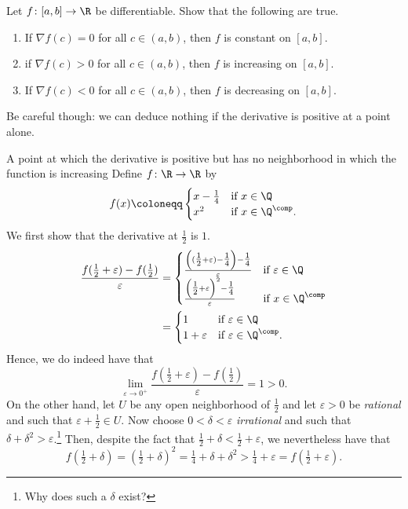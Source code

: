 \begin{exr}{}{}
Let $f\colon [a,b]\rightarrow \R$ be differentiable.  Show that the following are true.
\begin{enumerate}
\item If $\nabla f(c)=0$ for all $c\in (a,b)$, then $f$ is constant on $[a,b]$.
\item if $\nabla f(c)>0$ for all $c\in (a,b)$, then $f$ is increasing on $[a,b]$.
\item If $\nabla f(c)<0$ for all $c\in (a,b)$, then $f$ is decreasing on $[a,b]$.
\end{enumerate}
\end{exr}
Be careful though:  we can deduce nothing if the derivative is positive at a point alone.
\begin{exm}{A point at which the derivative is positive but has no neighborhood in which the function is increasing}{}
Define $f\colon \R \rightarrow \R$ by
\begin{equation}
f(x)\coloneqq \begin{cases}x-\tfrac{1}{4} & \text{if }x\in \Q \\ x^2 & \text{if }x\in \Q ^{\comp}.\end{cases}
\end{equation}
We first show that the derivative at $\frac{1}{2}$ is $1$.
\begin{equation}
\begin{split}
\frac{f(\tfrac{1}{2}+\varepsilon )-f(\tfrac{1}{2})}{\varepsilon} & =\begin{cases}\frac{\left( (\tfrac{1}{2}+\varepsilon )-\tfrac{1}{4}\right) -\tfrac{1}{4}}{\varepsilon} & \text{if }\varepsilon \in \Q \\ \frac{\left( \tfrac{1}{2}+\varepsilon \right) ^2-\tfrac{1}{4}}{\varepsilon} & \text{if }x\in \Q ^{\comp}\end{cases} \\
& =\begin{cases}1 & \text{if }\varepsilon \in \Q \\ 1+\varepsilon & \text{if }\varepsilon \in \Q ^{\comp}.\end{cases}
\end{split}
\end{equation}
Hence, we do indeed have that
\begin{equation}
\lim _{\varepsilon \to 0^+}\frac{f(\tfrac{1}{2}+\varepsilon )-f(\tfrac{1}{2})}{\varepsilon}=1>0.
\end{equation}
On the other hand, let $U$ be any open neighborhood of $\frac{1}{2}$ and let $\varepsilon >0$ be \emph{rational} and such that $\varepsilon +\frac{1}{2}\in U$.  Now choose $0<\delta <\varepsilon$ \emph{irrational} and such that $\delta +\delta ^2>\varepsilon$.\footnote{Why does such a $\delta$ exist?}  Then, despite the fact that $\frac{1}{2}+\delta <\frac{1}{2}+\varepsilon$, we nevertheless have that
\begin{equation}
f(\tfrac{1}{2}+\delta )=(\tfrac{1}{2}+\delta )^2=\tfrac{1}{4}+\delta +\delta ^2>\tfrac{1}{4}+\varepsilon =f(\tfrac{1}{2}+\varepsilon ).
\end{equation}
\end{exm}

